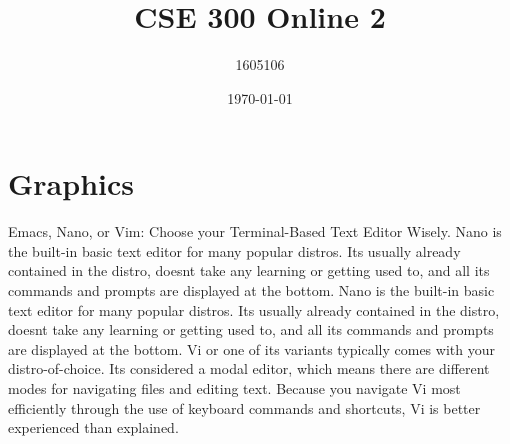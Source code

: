 \documentclass[14pt]{article}
\title{CSE 300 Online 2}
\author{1605106}
\date{\today}
\begin{document}
	\maketitle
	\section{Graphics}
	Emacs, Nano, or Vim: Choose your Terminal-Based Text Editor Wisely. Nano
	is the built-in basic text editor for many popular distros. Its usually already
	contained in the distro, doesnt take any learning or getting used to, and all
	its commands and prompts are displayed at the bottom. Nano is the built-in
	basic text editor for many popular distros. Its usually already contained in the
	distro, doesnt take any learning or getting used to, and all its commands and
	prompts are displayed at the bottom. Vi or one of its variants typically comes
	with your distro-of-choice. Its considered a modal editor, which means there
	are different modes for navigating files and editing text. Because you navigate
	Vi most efficiently through the use of keyboard commands and shortcuts, Vi is
	better experienced than explained.
\end{document}
